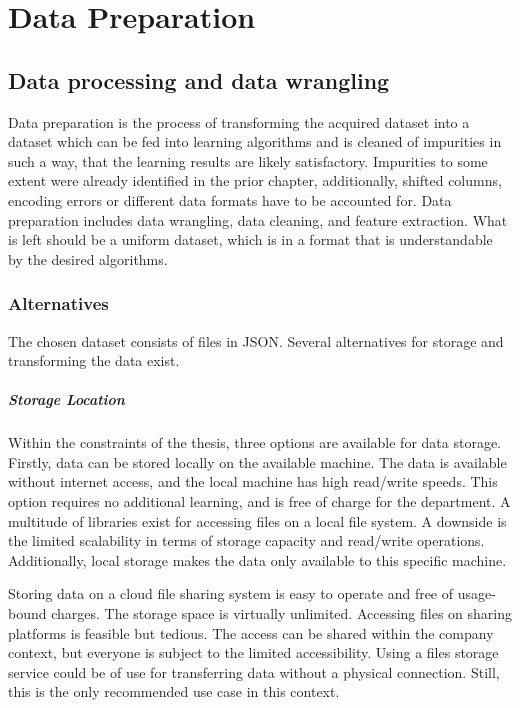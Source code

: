 \chapter{Data Preparation}

	\section{Data processing and data wrangling}
	
    Data preparation is the process of transforming the acquired dataset into a dataset which can be fed into learning algorithms and is cleaned of impurities in such a way, that the learning results are likely satisfactory. Impurities to some extent were already identified in the prior chapter, additionally, shifted columns, encoding errors or different data formats have to be accounted for.
    Data preparation includes data wrangling, data cleaning, and feature extraction. What is left should be a uniform dataset, which is in a format that is understandable by the desired algorithms.
    
        \subsection{Alternatives}
        The chosen dataset consists of files in \ac{JSON}. Several alternatives for storage and transforming the data exist. 
        
        \paragraph{Storage Location}
        Within the constraints of the thesis, three options are available for data storage. Firstly, data can be stored locally on the available machine. The data is available without internet access, and the local machine has high read/write speeds. This option requires no additional learning, and is free of charge for the department. A multitude of libraries exist for accessing files on a local file system. A downside is the limited scalability in terms of storage capacity and read/write operations. Additionally, local storage makes the data only available to this specific machine.
        
        Storing data on a cloud file sharing system is easy to operate and free of usage-bound charges. The storage space is virtually unlimited. Accessing files on sharing platforms is feasible but tedious. The access can be shared within the company context, but everyone is subject to the limited accessibility. Using a files storage service could be of use for transferring data without a physical connection. Still, this is the only recommended use case in this context.
        
